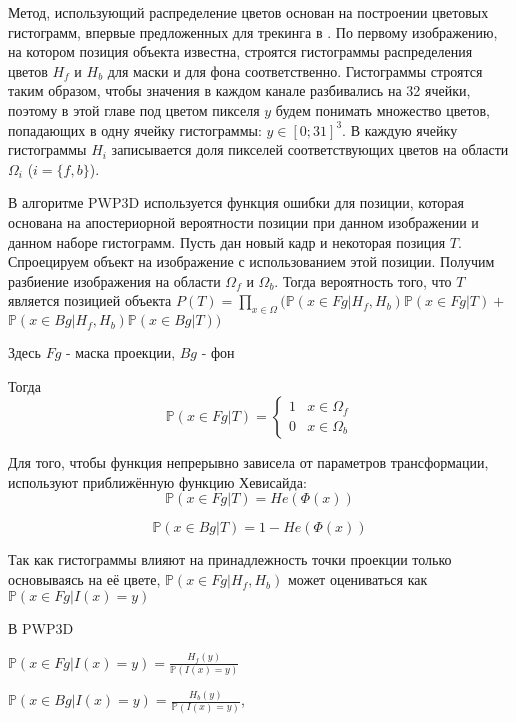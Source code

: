 Метод, использующий распределение цветов основан на построении цветовых
гистограмм, впервые предложенных для трекинга в \cite{Bibby2008}.
По первому изображению, на котором позиция объекта известна, строятся
гистограммы распределения цветов $H_f$ и $H_b$ для маски и для фона
соответственно.
Гистограммы строятся таким образом, чтобы значения в каждом канале разбивались
на 32 ячейки, поэтому в этой главе под цветом пикселя $y$ будем понимать
множество цветов, попадающих в одну ячейку гистограммы: $y \in [0; 31]^3$.
В каждую ячейку гистограммы $H_i$ записывается доля пикселей соответствующих
цветов на области $\Omega_i$ ($i = \{f, b\}$).

В алгоритме PWP3D \cite{PWP3D} используется функция ошибки для позиции, которая
основана на апостериорной вероятности позиции при данном изображении и данном
наборе гистограмм.
Пусть дан новый кадр и некоторая позиция $T$.
Спроецируем объект на изображение с использованием этой позиции.
Получим разбиение изображения на области $\Omega_f$ и $\Omega_b$.
Тогда вероятность того, что $T$
является позицией объекта
$
    P(T) = \prod\limits_{x \in \Omega}(\mathbb{P}(x \in Fg | H_f, H_b)\mathbb{P}(x \in Fg | T) +$ $\mathbb{P}(x \in Bg|H_f, H_b)\mathbb{P}(x \in Bg | T))
$


Здесь $Fg$ - маска проекции, $Bg$ - фон

Тогда
\begin{equation*}
    \mathbb{P}(x \in Fg | T) = 
     \begin{cases}
       1 &x \in \Omega_f\\
       0 &x \in \Omega_b
     \end{cases}
\end{equation*}

Для того, чтобы функция непрерывно зависела от параметров трансформации,
используют приближённую функцию Хевисайда:
$$
    \mathbb{P}(x \in Fg | T) = He(\Phi(x))
$$ 

$$
    \mathbb{P}(x \in Bg | T) = 1 - He(\Phi(x))
$$

Так как гистограммы влияют на принадлежность точки проекции только основываясь
на её цвете,
$\mathbb{P}(x \in Fg | H_f, H_b)$
может оцениваться как
$\mathbb{P}(x \in Fg | I(x) = y)$

В PWP3D

$
    \mathbb{P}(x \in Fg | I(x) = y) = \frac{H_f(y)}{\mathbb{P}(I(x) = y)}
$

$
    \mathbb{P}(x \in Bg | I(x) = y) = \frac{H_b(y)}{\mathbb{P}(I(x) = y)}
$,

